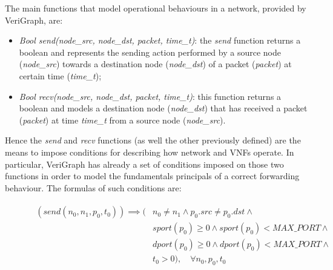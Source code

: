  The main functions that model operational behaviours in a network, provided by VeriGraph, are:
\begin{itemize}
	\item \textit{Bool send(node\_src, node\_dst, packet, time\_t)}: the \textit{send} function returns a boolean and represents the sending action performed by a source node (\textit{node\_src}) towards a destination node (\textit{node\_dst}) of a packet (\textit{packet}) at certain time (\textit{time\_t});
	\item \textit{Bool recv(node\_src, node\_dst, packet, time\_t)}:  this function returns a boolean and models a destination node (\textit{node\_dst}) that has received  a packet (\textit{packet}) at time \textit{time\_t} from a source node (\textit{node\_src}). 
\end{itemize} 
Hence the \textit{send} and \textit{recv} functions (as well the other previously defined) are the means to impose conditions for describing how network and VNFs operate. In particular, VeriGraph has already a set of conditions imposed on those two functions in order to model the fundamentals principals of a correct forwarding behaviour. The formulas of such conditions are:
\begin{figure}[h]
	{\footnotesize
		\begin{subequations}
			\begin{align}
				\begin{split}
					\label{send-formulas}
					(send(n_{0}, n_{1}, p_{0}, t_{0})) \implies (& n_{0} \neq n_{1} \wedge p_{0}.src \neq p_{0}.dst \wedge \\
					& sport(p_{0}) \geq 0 \wedge sport(p_{0}) < MAX\_PORT \wedge \\
					& dport(p_{0}) \geq 0 \wedge dport(p_{0}) < MAX\_PORT \wedge \\
					& t_{0} > 0 ), \quad \forall n_{0}, p_{0}, t_{0} \\
				\end{split}
			\end{align}
		\end{subequations}}
\end{figure} 
